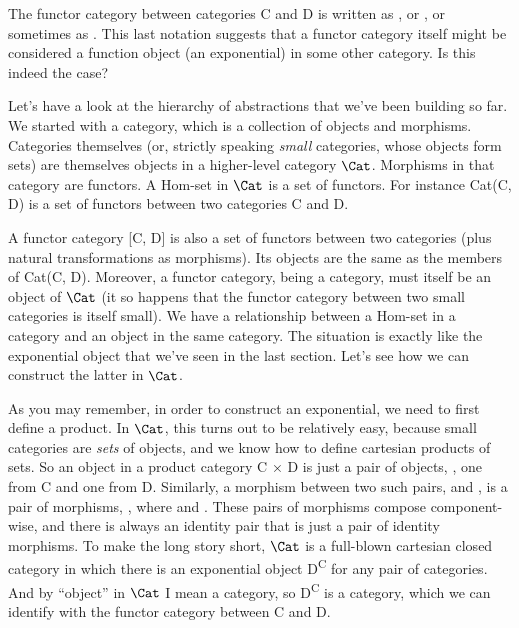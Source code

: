 \begin{figure}
\centering
{}
\end{figure}

The functor category between categories C and D is written as
, or \code{{[}C, D{]}}, or sometimes as
. This last notation suggests that a functor category itself
might be considered a function object (an exponential) in some other
category. Is this indeed the case?

Let's have a look at the hierarchy of abstractions that we've been
building so far. We started with a category, which is a collection of
objects and morphisms. Categories themselves (or, strictly speaking
\emph{small} categories, whose objects form sets) are themselves objects
in a higher-level category $\Cat$. Morphisms in that category are
functors. A Hom-set in $\Cat$ is a set of functors. For instance
Cat(C, D) is a set of functors between two categories C and D.

\begin{figure}
\centering
{}
\end{figure}

A functor category {[}C, D{]} is also a set of functors between two
categories (plus natural transformations as morphisms). Its objects are
the same as the members of Cat(C, D). Moreover, a functor category,
being a category, must itself be an object of $\Cat$ (it so
happens that the functor category between two small categories is itself
small). We have a relationship between a Hom-set in a category and an
object in the same category. The situation is exactly like the
exponential object that we've seen in the last section. Let's see how we
can construct the latter in $\Cat$.

As you may remember, in order to construct an exponential, we need to
first define a product. In $\Cat$, this turns out to be relatively
easy, because small categories are \emph{sets} of objects, and we know
how to define cartesian products of sets. So an object in a product
category C × D is just a pair of objects, , one from C
and one from D. Similarly, a morphism between two such pairs,
 and , is a pair of
morphisms, , where
 and
. These pairs of morphisms
compose component-wise, and there is always an identity pair that is
just a pair of identity morphisms. To make the long story short,
$\Cat$ is a full-blown cartesian closed category in which there is
an exponential object D\textsuperscript{C} for any pair of categories.
And by ``object'' in $\Cat$ I mean a category, so
D\textsuperscript{C} is a category, which we can identify with the
functor category between C and D.

